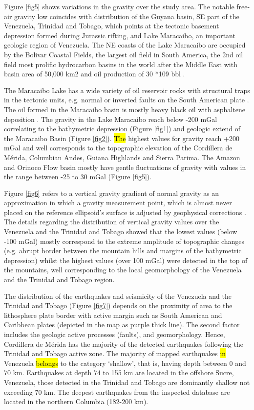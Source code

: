 \documentclass[sustainability,article,submit,pdftex,moreauthors]{Definitions/mdpi}
\begin{document}
Figure \ref{fig5} shows variations in the gravity over the study area. The notable free-air gravity low coincides with distribution of the Guyana basin, SE part of the Venezuela, Trinidad and Tobago, which points at the tectonic basement depression formed during Jurassic rifting, and Lake Maracaibo, an important geologic region of Venezuela. The NE coasts of the Lake Maracaibo are occupied by the Bolivar Coastal Fields, the largest oil field in South America, the 2nd oil field most prolific hydrocarbon basins in the world after the Middle East with basin area of 50,000 km2 and oil production of 30 *109 bbl \cite{Escalona}.   

The Maracaibo Lake has a wide variety of oil reservoir rocks with structural traps in the tectonic units, e.g. normal or inverted faults on the South American plate \cite{Bockmeulen}. The oil formed in the Maracaibo basin is mostly heavy black oil with asphaltene deposition \cite{Escobar,Memon}. The gravity in the Lake Maracaibo reach below -200 mGal correlating to the bathymetric depression (Figure \ref{fig1}) and geologic extend of the Maracaibo Basin (Figure \ref{fig2}).\hl{ The }highest values for gravity reach +200 mGal and well corresponds to the topographic elevation of the Cordillera de Mérida, Columbian Andes, Guiana Highlands and Sierra Parima. The Amazon and Orinoco Flow basin mostly have gentle fluctuations of gravity with values in the range between -25 to 30 mGal (Figure \ref{fig5}).

Figure \ref{fig6} refers to a vertical gravity gradient of normal gravity as an approximation in which a gravity measurement point, which is almost never placed on the reference ellipsoid’s surface is adjusted by geophysical corrections \citep{Li,Yilmaz}. The details regarding the distribution of vertical gravity values over the Venezuela and the Trinidad and Tobago showed that the lowest values (below -100 mGal) mostly correspond to the extreme amplitude of topographic changes (e.g. abrupt border between the mountain hills and margins of the bathymetric depression) whilst the highest values (over 100 mGal) were detected in the top of the mountains, well corresponding to the local geomorphology of the Venezuela and the Trinidad and Tobago region.

The distribution of the earthquakes and seismicity of the Venezuela and the Trinidad and Tobago (Figure \ref{fig7}) depends on the proximity of area to the lithosphere plate border with active margin such as South American and Caribbean plates (depicted in the map as purple thick line). The second factor includes the geologic active processes (faults), and geomorphology. Hence, Cordillera de Mérida has the majority of the detected earthquakes following the Trinidad and Tobago active zone. The majority of mapped earthquakes\hl{ in }Venezuela \hl{belongs} to the category ‘shallow’, that is, having depth between 0 and 70 km. Earthquakes at depth 74 to 155 km are located in the offshore Sucre, Venezuela, those detected in the Trinidad and Tobago are dominantly shallow not exceeding 70 km. The deepest earthquakes from the inspected database are located in the northern Columbia (182-200 km).
\end{document}
